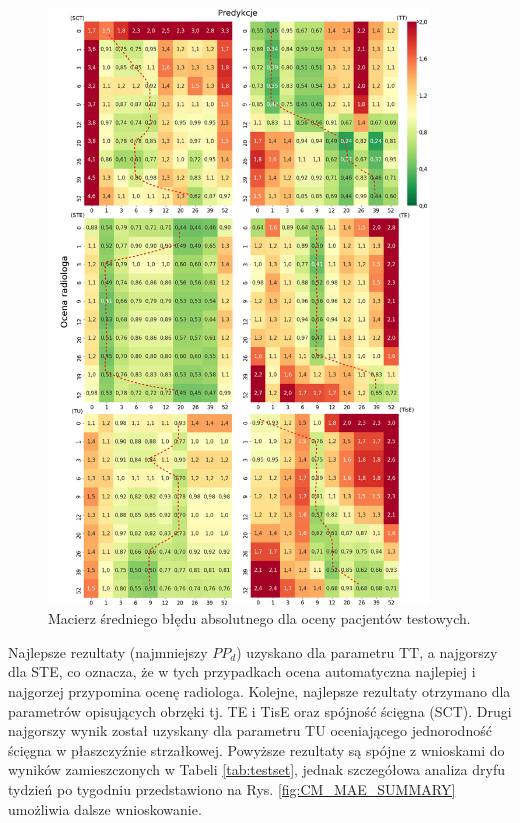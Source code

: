 \begin{figure}[]
	\centering
	\includegraphics[width=0.9\textwidth]{figures/cm.png}
	\caption{Macierz średniego błędu absolutnego dla oceny pacjentów testowych.}\label{fig:CM_MAE}
\end{figure}
\newpage
Najlepsze rezultaty (najmniejszy $PP_d$) uzyskano dla parametru TT, a najgorszy dla STE, co oznacza, że w tych przypadkach ocena automatyczna najlepiej \linebreak i najgorzej przypomina ocenę radiologa. Kolejne, najlepsze rezultaty otrzymano dla parametrów opisujących obrzęki tj. TE i TisE oraz spójność ścięgna (SCT). Drugi najgorszy wynik został uzyskany dla parametru TU oceniającego jednorodność ścięgna w płaszczyźnie strzałkowej. Powyższe rezultaty są spójne z wnioskami \linebreak do wyników zamieszczonych w Tabeli \ref{tab:testset}, jednak szczegółowa analiza dryfu tydzień po tygodniu przedstawiono na Rys. \ref{fig:CM_MAE_SUMMARY} umożliwia dalsze wnioskowanie.

